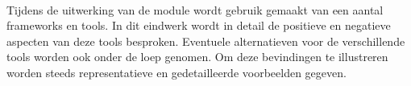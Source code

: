 \paragraph {} Tijdens de uitwerking van de module wordt gebruik gemaakt van een aantal
frameworks en tools. In dit eindwerk wordt in detail de positieve en negatieve aspecten
van deze tools besproken. Eventuele alternatieven voor de verschillende tools worden ook
onder de loep genomen. Om deze bevindingen te illustreren worden steeds representatieve en
gedetailleerde voorbeelden gegeven.

